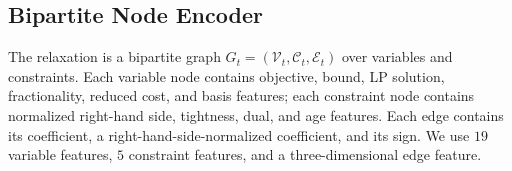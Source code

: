\documentclass{article}
\begin{document}


\subsection{Bipartite Node Encoder}

The relaxation is a bipartite graph
$G_t=(\mathcal{V}_t,\mathcal{C}_t,\mathcal{E}_t)$ over variables and constraints. Each variable node contains objective, bound, LP solution, fractionality, reduced cost, and basis features; each constraint node contains normalized right-hand side, tightness, dual, and age features. Each edge contains its coefficient, a right-hand-side-normalized coefficient, and its sign. We use $19$ variable features, $5$ constraint features, and a three-dimensional edge feature.
\end{document}

